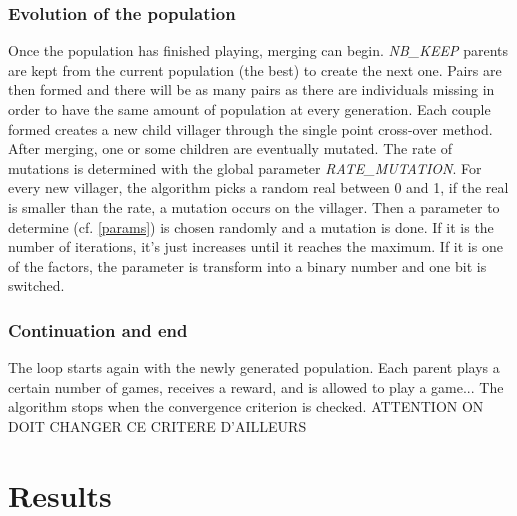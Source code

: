 \documentclass[11pt,a4paper]{article}
\begin{document}
\subsubsection{Evolution of the population}
Once the population has finished playing, merging can begin. \textit{NB\_KEEP} parents are kept from the current population (the best) to create the next one. Pairs are then formed and there will be as many pairs as there are individuals missing in order to have the same amount of population at every generation. Each couple formed creates a new child villager through the single point cross-over method.\\
After merging, one or some children are eventually mutated. The rate of mutations is determined with the global parameter \textit{RATE\_MUTATION}. For every new villager, the algorithm picks a random real between 0 and 1, if the real is smaller than the rate, a mutation occurs on the villager. Then a parameter to determine (cf. \ref{params})
is chosen randomly and a mutation is done. If it is the number of iterations, it's just increases until it reaches the maximum. If it is one of the factors, the parameter is transform into a binary number and one bit is switched.
\subsubsection{Continuation and end}
The loop starts again with the newly generated population. Each parent plays a certain number of games, receives a reward, and is allowed to play a game... The algorithm stops when the convergence criterion is checked. 
ATTENTION ON DOIT CHANGER CE CRITERE D'AILLEURS
\section{Results}
\end{document}
